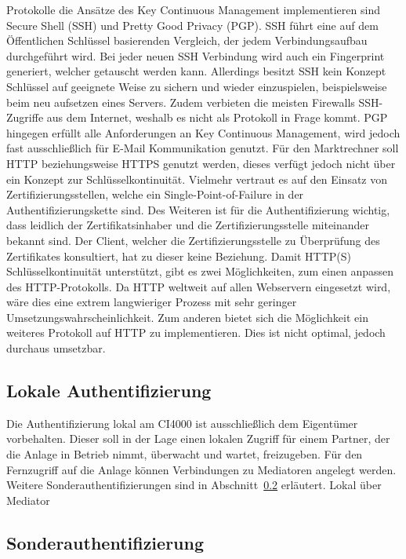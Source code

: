 \documentclass[11pt,a4paper]{report}
\begin{document}
Protokolle die Ansätze des Key Continuous Management implementieren sind Secure Shell (SSH) und Pretty Good Privacy (PGP). SSH führt eine auf dem Öffentlichen Schlüssel basierenden Vergleich, der jedem Verbindungsaufbau durchgeführt wird. Bei jeder neuen SSH Verbindung wird auch ein Fingerprint generiert, welcher getauscht werden kann. Allerdings besitzt SSH kein Konzept Schlüssel auf geeignete Weise zu sichern und wieder einzuspielen, beispielsweise beim neu aufsetzen eines Servers. Zudem verbieten die meisten Firewalls SSH-Zugriffe aus dem Internet, weshalb es nicht als Protokoll in Frage kommt. PGP hingegen erfüllt alle Anforderungen an Key Continuous Management, wird jedoch fast ausschließlich für E-Mail Kommunikation genutzt. Für den Marktrechner soll HTTP beziehungsweise HTTPS genutzt werden, dieses verfügt jedoch nicht über ein Konzept zur Schlüsselkontinuität. Vielmehr vertraut es auf den Einsatz von Zertifizierungsstellen, welche ein Single-Point-of-Failure in der Authentifizierungskette sind. Des Weiteren ist für die Authentifizierung wichtig, dass leidlich der Zertifikatsinhaber und die Zertifizierungsstelle miteinander bekannt sind. Der Client, welcher die Zertifizierungsstelle zu Überprüfung des Zertifikates konsultiert, hat zu dieser keine Beziehung. Damit HTTP(S) Schlüsselkontinuität unterstützt, gibt es zwei Möglichkeiten, zum einen anpassen des HTTP-Protokolls. Da HTTP weltweit auf allen Webservern eingesetzt wird, wäre dies eine extrem langwieriger Prozess mit sehr geringer Umsetzungswahrscheinlichkeit. Zum anderen bietet sich die Möglichkeit ein weiteres Protokoll auf HTTP zu implementieren. Dies ist nicht optimal, jedoch durchaus umsetzbar.

\subsection{Lokale Authentifizierung}

Die Authentifizierung lokal am CI4000 ist ausschließlich dem Eigentümer vorbehalten. Dieser soll in der Lage einen lokalen Zugriff für einem Partner, der die Anlage in Betrieb nimmt, überwacht und wartet, freizugeben. Für den Fernzugriff auf die Anlage können Verbindungen zu Mediatoren angelegt werden. Weitere Sonderauthentifizierungen sind in Abschnitt~\ref{sec:extra_auth} erläutert. Lokal über Mediator

\subsection{Sonderauthentifizierung} \label{sec:extra_auth}
\end{document}
